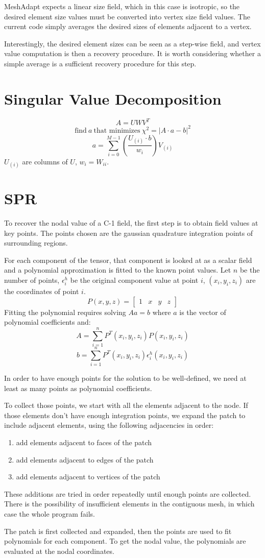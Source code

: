 \documentclass{article}
\begin{document}
MeshAdapt expects a linear size field, which in this
case is isotropic, so the desired element size values
must be converted into vertex size field values.
The current code simply averages the desired sizes
of elements adjacent to a vertex.

Interestingly, the desired element sizes can be seen
as a step-wise field, and vertex value computation
is then a recovery procedure.
It is worth considering whether a simple average
is a sufficient recovery procedure for this step.

\appendix
\section{Singular Value Decomposition}
\[A=UWV^T\]
\[\text{find}\ a\ \text{that minimizes}\ \chi^2=|A\cdot a-b|^2\]
\[a = \sum_{i=0}^{M-1}\left(\frac{U_{(i)}\cdot b}{w_i}\right)V_{(i)}\]
$U_{(i)}$ are columns of $U$, $w_i=W_{ii}$.

\section{SPR}

To recover the nodal value of a C-1 field, the first
step is to obtain field values at key points.
The points chosen are the gaussian quadrature integration
points of surrounding regions.

For each component of the tensor, that component is looked
at as a scalar field and a polynomial approximation is
fitted to the known point values.
Let $n$ be the number of points, $\epsilon_i^h$ be the
original component value at point $i$, $(x_i,y_i,z_i)$
are the coordinates of point $i$.
\[P(x,y,z)=
\begin{bmatrix}
1 & x & y & z
\end{bmatrix}
\]
Fitting the polynomial requires solving $Aa=b$ where $a$
is the vector of polynomial coefficients and:
\[A=\sum_{i=1}^nP^T(x_i,y_i,z_i)P(x_i,y_i,z_i)\]
\[b=\sum_{i=1}^nP^T(x_i,y_i,z_i)\epsilon_i^h(x_i,y_i,z_i)\]

In order to have enough points for the solution to be
well-defined, we need at least as many points as
polynomial coefficients.

To collect those points, we start with all the elements
adjacent to the node.
If those elements don't have enough integration points,
we expand the patch to include adjacent elements, using
the following adjacencies in order:
\begin{enumerate}
\item add elements adjacent to faces of the patch
\item add elements adjacent to edges of the patch
\item add elements adjacent to vertices of the patch
\end{enumerate}
These additions are tried in order repeatedly until
enough points are collected.
There is the possibility of insufficient elements
in the contiguous mesh, in which case the whole program fails.

The patch is first collected and expanded, then the points
are used to fit polynomials for each component.
To get the nodal value, the polynomials are evaluated
at the nodal coordinates.
\end{document}
